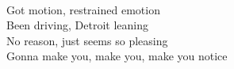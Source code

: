 \\
Got motion, restrained emotion \\
Been driving, Detroit leaning \\
No reason, just seems so pleasing \\
Gonna make you, make you, make you notice \\
